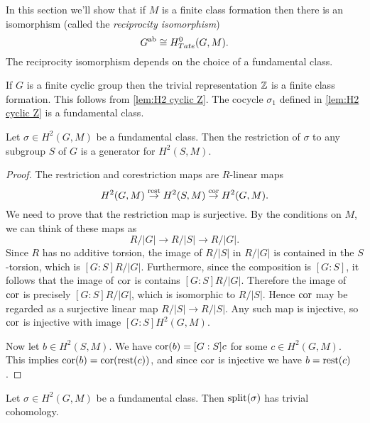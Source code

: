 In this section we'll show that if $M$ is a finite class formation then
there is an isomorphism (called the \emph{reciprocity isomorphism})
\[
	G^{\mathrm{ab}} \cong H^0_{Tate}(G,M).
\]
The reciprocity isomorphism depends on the choice of a fundamental class.


\begin{example}
	If $G$ is a finite cyclic group then the trivial representation ${\mathbb Z}$
	is a finite class formation.
	This follows from \ref{lem:H2 cyclic Z}.
	The cocycle $\sigma_1$ defined in \ref{lem:H2 cyclic Z} is a fundamental class.
\end{example}


\begin{lemma} \label{lem:restriction fundamental class generates}
	Let $\sigma \in H^2(G,M)$ be a fundamental class.
	Then the restriction of $\sigma$ to any subgroup $S$ of $G$
	is a generator for $H^2(S,M)$.
\end{lemma}

\begin{proof}
	The restriction and corestriction maps are $R$-linear maps
	\[
		H^2(G,M) \stackrel{\mathrm{rest}}\to H^2(S,M) \stackrel{\mathrm{cor}}\to H^2(G,M).
	\]
	We need to prove that the restriction map is surjective.
	By the conditions on $M$, we can think of these maps as
	\[
		R / |G| \to R / |S| \to R / |G|.
	\]
	Since $R$ has no additive torsion, the image of $R/|S|$ in $R/|G|$
	is contained in the $S$-torsion, which is $[G:S] R / |G|$.
	Furthermore, since the composition is $[G:S]$,
	it follows that the image of $\mathrm{cor}$ is contains $[G:S] R / |G|$.
	Therefore the image of $\mathrm{cor}$ is precisely $[G:S] R / |G|$, which
	is isomorphic to $R/|S|$. Hence $\mathrm{cor}$ may be regarded as a surjective linear map
	$R/|S| \to R/|S|$. Any such map is injective, so $\mathrm{cor}$ is injective with image
	$[G:S] H^2(G,M)$.

	Now let $b \in H^2(S,M)$. We have $\mathrm{cor}(b) = [G:S]c$ for some $c \in H^2(G,M)$.
	This implies $\mathrm{cor}(b) = \mathrm{cor} (\mathrm{rest}( c))$, and since $\mathrm{cor}$ is injective we have
	$b = \mathrm{rest}(c)$.
\end{proof}



\begin{theorem} \label{thm:splitting module trivial}
	Let $\sigma \in H^2(G,M)$ be a fundamental class.
	Then $\mathrm{split}(\sigma)$ has trivial cohomology.
\end{theorem}

